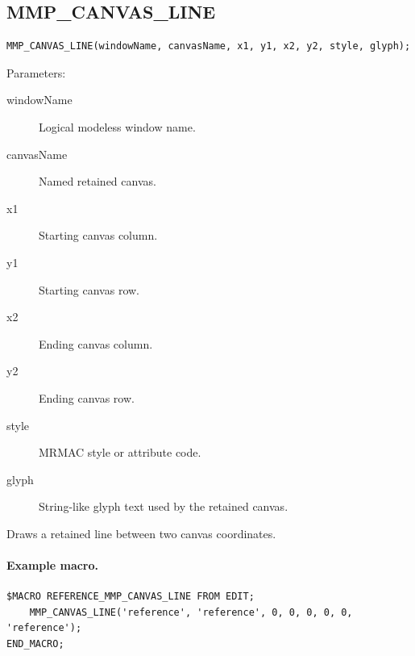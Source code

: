 \documentclass[a4paper,10pt,twoside,openany]{book}
\newenvironment{mrmacextension}{\begin{changebar}}{\end{changebar}}
\begin{document}
\begin{mrmacextension}
\label{prim:procedure-mmp-canvas-line}
\subsection*{MMP\_CANVAS\_LINE}
\begin{verbatim}
MMP_CANVAS_LINE(windowName, canvasName, x1, y1, x2, y2, style, glyph);
\end{verbatim}
Parameters:
\begin{description}
\item[windowName] Logical modeless window name.
\item[canvasName] Named retained canvas.
\item[x1] Starting canvas column.
\item[y1] Starting canvas row.
\item[x2] Ending canvas column.
\item[y2] Ending canvas row.
\item[style] MRMAC style or attribute code.
\item[glyph] String-like glyph text used by the retained canvas.
\end{description}

Draws a retained line between two canvas coordinates.

\paragraph{Example macro.}
\begin{verbatim}
$MACRO REFERENCE_MMP_CANVAS_LINE FROM EDIT;
    MMP_CANVAS_LINE('reference', 'reference', 0, 0, 0, 0, 0, 'reference');
END_MACRO;
\end{verbatim}
\end{mrmacextension}
\end{document}
